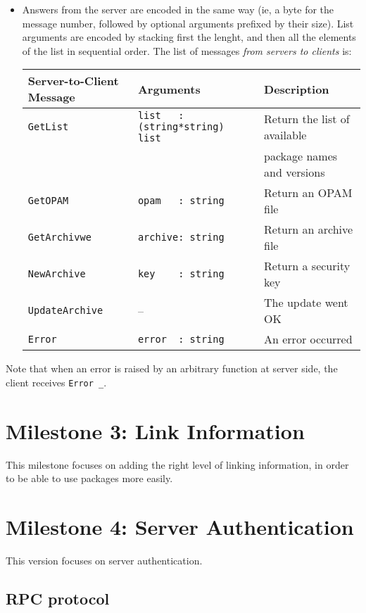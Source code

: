 \documentclass[a4paper,11pt]{article}
\begin{document}
\begin{itemize}
\item Answers from the server are encoded in the same way (ie, a byte
  for the message number, followed by optional arguments prefixed by
  their size). List arguments are encoded by stacking first the
  lenght, and then all the elements of the list in sequential order.
  The list of messages {\em from servers to clients} is:

{\small
\begin{tabular}{|l|l|l|}
\hline
Server-to-Client Message & Arguments & Description \\
\hline
\hline
\verb+GetList+      & \verb+list   : (string*string) list+ & Return the list
of available \\
 & & package names and versions \\
\hline
\verb+GetOPAM+      & \verb+opam   : string+ & Return an OPAM file \\
\hline
\verb+GetArchivwe+  & \verb+archive: string+ & Return an archive file \\
\hline
\verb+NewArchive+   & \verb+key    : string+ & Return a security key \\
\hline
\verb+UpdateArchive+& --                     & The update went OK \\
\hline
\verb+Error+        & \verb+error  : string+ & An error occurred \\
\hline
\end{tabular}
}

\end{itemize}

Note that when an error is raised by an arbitrary function
 at server side, the client receives \verb|Error _|.



\section{Milestone 3: Link Information}

This milestone focuses on adding the right level of linking
information, in order to be able to use packages more easily.


\section{Milestone 4: Server Authentication}

This version focuses on server authentication.

\subsection{RPC protocol}
\end{document}
